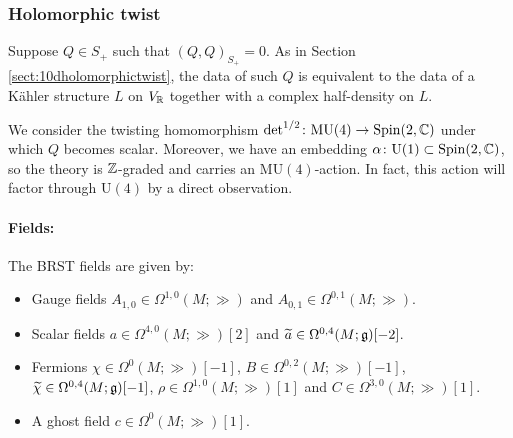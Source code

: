 \documentclass[10pt, oneside]{article}
\newcommand{\MU}{\mathrm{MU}}
\renewcommand{\U}{\mathrm{U}}
\begin{document}
\subsubsection{Holomorphic twist}
\label{sect:8dholomorphictwist}

Suppose $Q\in S_+$ such that $(Q, Q)_{S_+}=0$. As in Section \ref{sect:10dholomorphictwist}, the data of such $Q$ is equivalent to the data of a K\"ahler structure $L$ on $V_\mathbb R$ together with a complex half-density on $L$.

We consider the twisting homomorphism $\det^{1/2}\colon \MU(4)\rightarrow \Spin(2, \CC)$ under which $Q$ becomes scalar. Moreover, we have an embedding $\alpha\colon \U(1)\subset\Spin(2, \CC)$, so the theory is $\mathbb Z$-graded and carries an $\MU(4)$-action. In fact, this action will factor through $\U(4)$ by a direct observation.

\vspace{-10pt}
\paragraph{Fields:} The BRST fields are given by:
\begin{itemize}
\item Gauge fields $A_{1, 0}\in\Omega^{1, 0}(M; \gg)$ and $A_{0, 1}\in\Omega^{0, 1}(M; \gg)$.
\item Scalar fields $a\in\Omega^{4,0}(M; \gg)[2]$ and $\widetilde{a}\in\Omega^{0, 4}(M; \mathfrak{g})[-2]$.
\item Fermions $\chi\in\Omega^0(M; \gg)[-1]$, $B\in\Omega^{0, 2}(M; \gg)[-1]$, $\widetilde{\chi}\in\Omega^{0, 4}(M; \mathfrak{g})[-1]$, $\rho\in\Omega^{1, 0}(M; \gg)[1]$ and $C\in\Omega^{3, 0}(M; \gg)[1]$.
\item A ghost field $c\in \Omega^0(M; \gg)[1]$.
\end{itemize}
\end{document}

